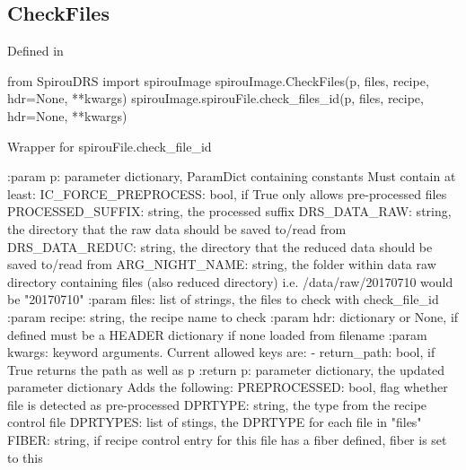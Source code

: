 \noindent\begin{minipage}{\textwidth}
\subsection{CheckFiles}

Defined in \spirouFile{}

\begin{pythonbox}
from SpirouDRS import spirouImage
spirouImage.CheckFiles(p, files, recipe, hdr=None, **kwargs)
spirouImage.spirouFile.check_files_id(p, files, recipe, hdr=None, **kwargs)
\end{pythonbox}

\begin{pythondocstring}
Wrapper for spirouFile.check_file_id

:param p: parameter dictionary, ParamDict containing constants
    Must contain at least:
        IC_FORCE_PREPROCESS: bool, if True only allows pre-processed files
        PROCESSED_SUFFIX: string, the processed suffix
        DRS_DATA_RAW: string, the directory that the raw data should
                      be saved to/read from
            DRS_DATA_REDUC: string, the directory that the reduced data
                            should be saved to/read from
        ARG_NIGHT_NAME: string, the folder within data raw directory
                        containing files (also reduced directory) i.e.
                        /data/raw/20170710 would be "20170710"
:param files: list of strings, the files to check with check_file_id
:param recipe: string, the recipe name to check
:param hdr: dictionary or None, if defined must be a HEADER dictionary if
            none loaded from filename
:param kwargs: keyword arguments. Current allowed keys are:
                - return_path: bool, if True returns the path as well as p
:return p: parameter dictionary, the updated parameter dictionary
    Adds the following:
        PREPROCESSED: bool, flag whether file is detected as 
                      pre-processed
        DPRTYPE: string, the type from the recipe control file 
        DPRTYPES: list of stings, the DPRTYPE for each file in "files"
        FIBER: string, if recipe control entry for this file has a
               fiber defined, fiber is set to this
\end{pythondocstring}
\end{minipage}




